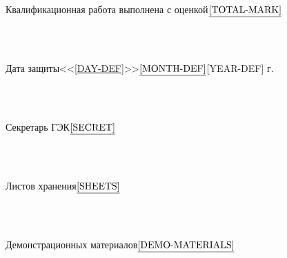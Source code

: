 \documentclass[10pt]{article}
\begin{document}
~\\~\\Квалификационная работа выполнена с оценкой\qquad$\underset{}{\underline{\hspace{0\textwidth\text{[TOTAL-MARK]}}}}$

~\\~\\Дата защиты\qquad<<\underline{[DAY-DEF]}>>$\underset{}{\underline{\hspace{0\textwidth\text{[MONTH-DEF]}}}}$[YEAR-DEF] г.

~\\~\\Секретарь ГЭК\qquad$\underset{}{\underline{\hspace{0\textwidth\text{[SECRET]}}}}$

~\\~\\Листов хранения\qquad$\underset{}{\underline{\hspace{0\textwidth\text{[SHEETS]}}}}$

~\\~\\Демонстрационных материалов\qquad$\underset{}{\underline{\hspace{0\textwidth\text{[DEMO-MATERIALS]}}}}$
\end{document}
